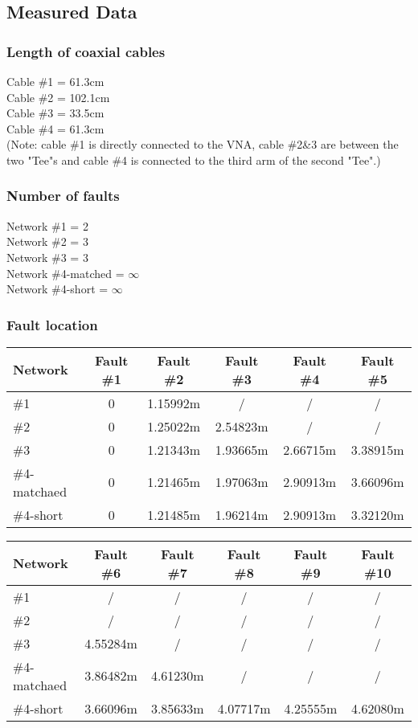 \documentclass[11pt,oneside,a4paper]{report}
\begin{document}
\subsection*{Measured Data}
\subsubsection{Length of coaxial cables}
Cable \#1 = 61.3cm\\
Cable \#2 = 102.1cm\\
Cable \#3 = 33.5cm\\
Cable \#4 = 61.3cm\\
(Note: cable \#1 is directly connected to the VNA, cable \#2\&3 are between the two "Tee"s and cable \#4 is connected to the third arm of the second "Tee".)

\subsubsection*{Number of faults}
Network \#1 = 2\\
Network \#2 = 3\\
Network \#3 = 3\\
Network \#4-matched = \(\infty\)\\
Network \#4-short = \(\infty\)
\subsubsection*{Fault location}
\begin{table}[htbp]
\begin{tabular}{lccccc}
\toprule
Network & Fault \#1 & Fault \#2 & Fault \#3 & Fault \#4 & Fault \#5 \\
\midrule
\#1 & 0 & 1.15992m & / & / & / \\
\#2 & 0 & 1.25022m & 2.54823m & / & / \\
\#3 & 0 & 1.21343m & 1.93665m & 2.66715m & 3.38915m \\
\#4-matchaed & 0 & 1.21465m & 1.97063m & 2.90913m & 3.66096m \\
\#4-short & 0 & 1.21485m & 1.96214m & 2.90913m & 3.32120m \\
\bottomrule
\end{tabular}
\end{table}

\begin{table}[htbp]
\begin{tabular}{lccccc}
\toprule
Network & Fault \#6 & Fault \#7 & Fault \#8 & Fault \#9 & Fault \#10 \\
\midrule
\#1 & / & / & / & / & / \\
\#2 & / & / & / & / & / \\
\#3 & 4.55284m & / & / & / & / \\
\#4-matchaed & 3.86482m & 4.61230m & / & / & / \\
\#4-short & 3.66096m & 3.85633m & 4.07717m & 4.25555m & 4.62080m \\
\bottomrule
\end{tabular}
\end{table}
\end{document}
